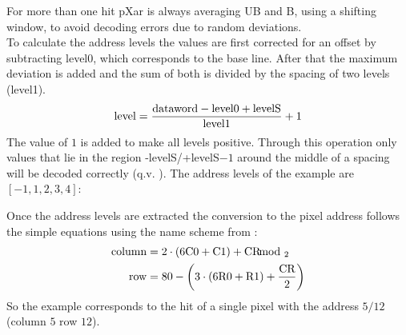 \documentclass[british,11pt,a4paper]{memoir}
\begin{document}
For more than one hit pXar is always averaging \ac{UB} and \ac{B}, using a shifting window, to avoid decoding errors due to random deviations.\\
To calculate the address levels the values are first corrected for an offset by subtracting level$0$, which corresponds to the base line. After that the maximum deviation is added and the sum of both is divided by the spacing of two levels (level1).
\begin{equation}
	\text{level} = \frac{\text{dataword} - \text{level}0 + \text{levelS}}{\text{level}1} + 1
\end{equation}
The value of $1$ is added to make all levels positive. Through this operation only values that lie in the region -levelS/+levelS$-1$ around the middle of a spacing will be decoded correctly (q.v. ). The address levels of the example are $[-1, 1, 2, 3, 4]$:
\begin{center}
\terminal{[-264, -69, 29, -1, 1, 2, 3, 4, 43]}                                                    
\end{center}
Once the address levels are extracted the conversion to the pixel address follows the simple equations using the name scheme from :
\begin{align}
	\text{column} &= 	2\cdot\left(  6\text{C}0 + \text{C}1 \right) + \text{CR}\hspace*{-8pt}\mod_{2}\\
	\text{row} &= 80 - \left( 3\cdot\left(  6\text{R}0 + \text{R}1 \right) + \frac{\text{CR}}{2}\right)
\end{align}
So the example corresponds to the hit of a single pixel with the address $5/12$ (column $5$ row $12$).
\end{document}
